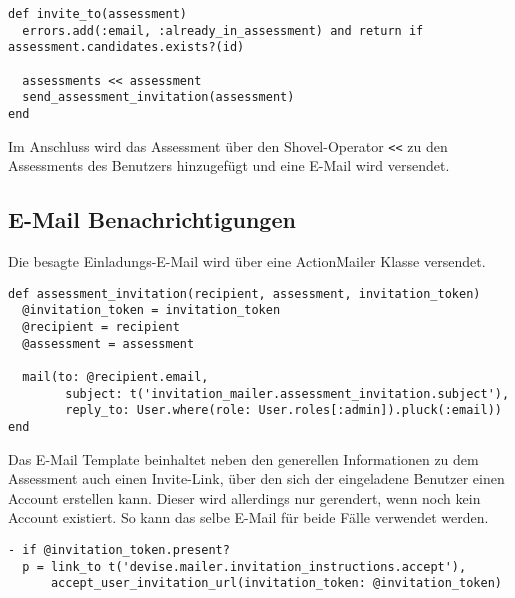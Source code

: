 \begin{codebox}
\begin{verbatim}
def invite_to(assessment)
  errors.add(:email, :already_in_assessment) and return if assessment.candidates.exists?(id)
  
  assessments << assessment
  send_assessment_invitation(assessment)
end
\end{verbatim}
\end{codebox}

Im Anschluss wird das Assessment über den Shovel-Operator \texttt{<<} zu den Assessments des Benutzers
hinzugefügt und eine E-Mail wird versendet.

\newpage

\subsection{E-Mail Benachrichtigungen}

Die besagte Einladungs-E-Mail wird über eine ActionMailer Klasse versendet.

\begin{codebox}
\begin{verbatim}
def assessment_invitation(recipient, assessment, invitation_token)
  @invitation_token = invitation_token
  @recipient = recipient
  @assessment = assessment

  mail(to: @recipient.email,
        subject: t('invitation_mailer.assessment_invitation.subject'),
        reply_to: User.where(role: User.roles[:admin]).pluck(:email))
end
\end{verbatim}
\end{codebox}

Das E-Mail Template beinhaltet neben den generellen Informationen zu dem Assessment auch einen Invite-Link, über den
sich der eingeladene Benutzer einen Account erstellen kann. Dieser wird allerdings nur gerendert, wenn noch kein Account existiert.
So kann das selbe E-Mail für beide Fälle verwendet werden.

\begin{codebox}
\begin{verbatim}
- if @invitation_token.present?
  p = link_to t('devise.mailer.invitation_instructions.accept'),
      accept_user_invitation_url(invitation_token: @invitation_token)
\end{verbatim}
\end{codebox}
